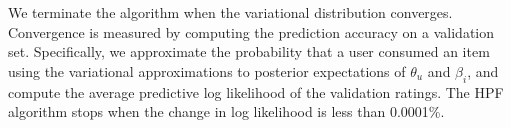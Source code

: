 
We terminate the algorithm when the variational distribution
converges. Convergence is measured by computing the prediction
accuracy on a validation set.  Specifically, we approximate the
probability that a user consumed an item using the variational
approximations to posterior expectations of $\theta_u$ and $\beta_i$,
and compute the average predictive log likelihood of the validation
ratings. The HPF algorithm stops when the change in log likelihood is
less than 0.0001\%.





